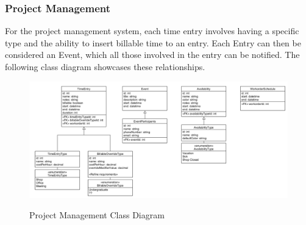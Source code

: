 {{{{{{{\subsubsection{Project Management}
For the project management system, each time entry involves having a specific type and the ability to insert billable time to an entry. Each Entry can then be considered an Event, which all those involved in the entry can be notified. The following class diagram showcases these relationships. 
\begin{figure}[H]
	\centering
	\includegraphics[width=5in]{project-management.png}\\
	\caption{Project Management Class Diagram}
	\label{fig:tobias}
\end{figure}

}}}}}}}
